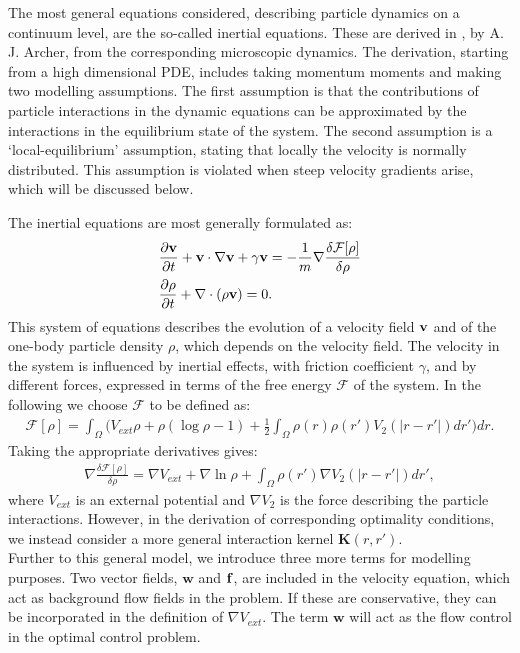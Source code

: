 
The most general equations considered, describing particle dynamics on a continuum level, are the so-called inertial equations. These are derived in \cite{Archer1}, by A. J. Archer, from the corresponding microscopic dynamics. The derivation, starting from a high dimensional PDE, includes taking momentum moments and making two modelling assumptions. The first assumption is that the contributions of particle interactions in the dynamic equations can be approximated by the interactions in the equilibrium state of the system. The second assumption is a `local-equilibrium' assumption, stating that locally the velocity is normally distributed. This assumption is violated when steep velocity gradients arise, which will be discussed below.

The inertial equations are most generally formulated as:
\begin{align*}
	&\frac{\partial \mathbf{v}}{\partial t} + \mathbf{v} \cdot \nabla \mathbf{v} + \gamma \mathbf{v} = - \frac{1}{m} \nabla \frac{\delta \mathcal{F}[\rho]}{\delta \rho}\\
	&\frac{\partial \rho}{\partial t} + \nabla \cdot (\rho \mathbf{v}) =0.
\end{align*}
This system of equations describes the evolution of a velocity field $\mathbf{v}$ and of the one-body particle density $\rho$, which depends on the velocity field.
The velocity in the system is influenced by inertial effects, with friction coefficient $\gamma$, and by different forces, expressed in terms of the free energy $\mathcal{F}$ of the system.
In the following we choose $\mathcal{F}$ to be defined as:
\begin{align}
	\label{eqn:freeenergy1}
	\mathcal{F}[\rho]=\int_\Omega  \bigg( V_{ext}\rho + \rho (\log \rho -1) +  \frac{1}{2}\int_\Omega \rho(r) \rho(r')V_2(|r-r'|)dr' \bigg) dr.
\end{align}
Taking the appropriate derivatives gives:
\begin{align*}
	\nabla \frac{\delta \mathcal{F}[\rho]}{\delta \rho} = \nabla V_{ext} + \nabla \ln \rho + \int_\Omega \rho(r') \nabla V_2(|r-r'|)dr',
\end{align*}
where $V_{ext}$ is an external potential and $\nabla V_2$ is the force describing the particle interactions. However, in the derivation of corresponding optimality conditions, we instead consider a more general interaction kernel $\mathbf{K}(r,r')$.
\\
Further to this general model, we introduce three more terms for modelling purposes. Two vector fields, $\mathbf{w}$ and $\mathbf{f}$, are included in the velocity equation, which act as background flow fields in the problem. If these are conservative, they can be incorporated in the definition of $\nabla V_{ext}$. The term $\mathbf{w}$ will act as the flow control in the optimal control problem.
